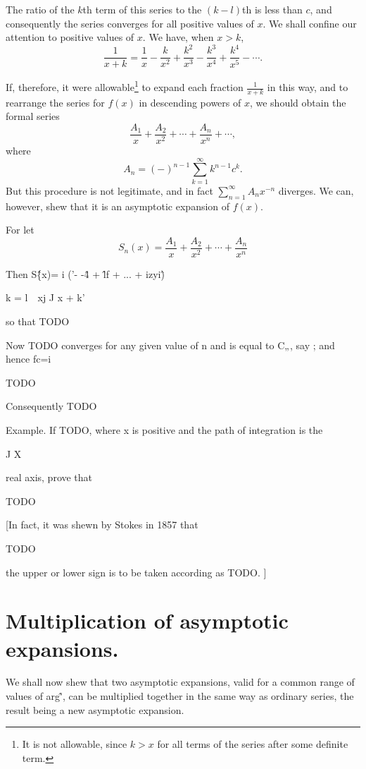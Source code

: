 % 
%

The ratio of the $k$th term of this series to the $(k- l)$th is less
than $c$, and consequently the series converges for all positive values
of $x$. We shall confine our attention to positive values of $x$. We have,
when $x > k$,
$$
\frac{1}{x+k}
=
\frac{1}{x}
- \frac{k}{x^{2}}
+ \frac{k^{2}}{x^{3}}
- \frac{k^{3}}{x^{4}}
+ \frac{k^{4}}{x^{5}}
- \cdots.
$$

If, therefore, it were allowable\footnote{It is not allowable, since
  $k>x$ for all terms of the series after some definite term.} to expand
each fraction $\frac{1}{x+k}$ in this way, and to rearrange the series
for $f(x)$ in descending powers of $x$, we should obtain the formal series 
$$
\frac{A_{1}}{x}
+ \frac{A_{2}}{x^{2}}
+ \cdots
+ \frac{A_{n}}{x^{n}}
+ \cdots,
$$
where
$$
A_{n}
=
(-)^{n-1}
\sum_{k=1}^{\infty} k^{n-1} c^{k}.
$$
But this procedure is not legitimate, and in fact 
$\sum_{n=1}^{\infty} A_{n} x^{-n}$
diverges. We can, however, shew that it is an asymptotic expansion of
$f(x)$.

For let
$$
S_{n}(x)
=
\frac{A_{1}}{x}
+ \frac{A_{2}}{x^{2}}
+ \cdots
+ \frac{A_{n}}{x^{n}} %
$$

Then S\^\{x)= i ('- -\^4 + \^lf + ... + izyi\^)



k = l\ \ xj J x + k'



so that TODO

Now TODO converges for any given value of n and is equal to C„, say ; and hence
fc=i

TODO

Consequently TODO

Example. If TODO, where x is positive and the path of integration is the

J X

real axis, prove that

TODO

[In fact, it was shewn by Stokes in 1857 that

TODO

the upper or lower sign is to be taken according as TODO. ]
\section{Multiplication of asymptotic expansions.}

We shall now shew that two asymptotic expansions, valid for a common
range of values of arg\^', can be multiplied together in the same way
as ordinary series, the result being a new asymptotic expansion.

